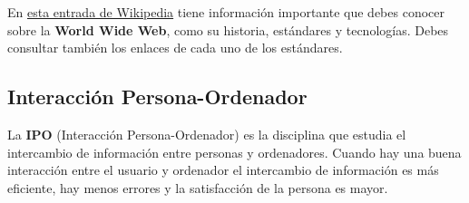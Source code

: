 En \href{https://es.wikipedia.org/wiki/World_Wide_Web}{esta entrada de Wikipedia} tiene información importante que debes conocer sobre la \textbf{World Wide Web}, como su historia, estándares y tecnologías. Debes consultar también los enlaces de cada uno de los estándares.

\subsection{Interacción Persona-Ordenador}

La \textbf{IPO} (Interacción Persona-Ordenador) es la disciplina que estudia el intercambio de información entre personas y ordenadores. Cuando hay una buena interacción entre el usuario y ordenador el intercambio de información es más eficiente, hay menos errores y la satisfacción de la persona es mayor.




